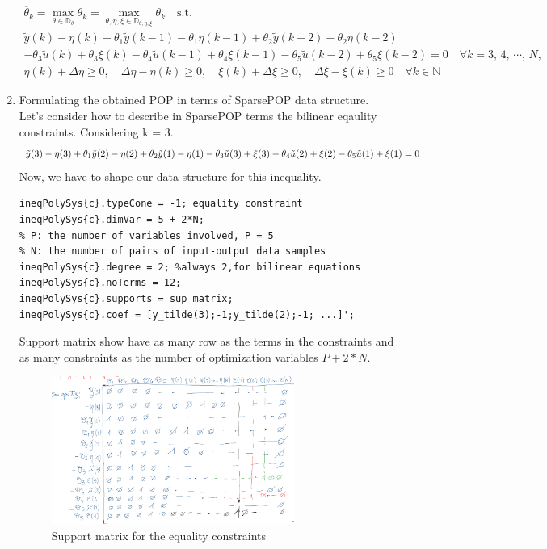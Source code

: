 \begin{enumerate}
\[
\begin{array}{c}
\overline{\theta}_k = \max\limits_{\theta \in \mathbb{D}_\theta} \theta_k = \max\limits_{\theta, \eta, \xi \in \mathbb{D}_{\theta, \eta, \xi}} \theta_k \quad \text{s.t.} \\
\tilde{y}(k) - \eta(k) + \theta_1 \tilde{y}(k-1) - \theta_1\eta(k-1) + \theta_2 \tilde{y}(k-2) - \theta_2\eta(k-2) \\
- \theta_3 \tilde{u}(k) +\theta_3 \xi(k) - \theta_4 \tilde{u}(k-1) + \theta_4\xi(k-1) - \theta_5 \tilde{u}(k-2) + \theta_5 \xi(k-2) = 0 \quad \forall k = 3,\,4,\,\cdots,\,N,\\
\eta(k) + \Delta\eta \geq 0, \quad \Delta\eta - \eta(k) \geq 0, \quad \xi(k) + \Delta\xi \geq 0, \quad \Delta\xi - \xi(k) \geq 0 \quad \forall k \in \mathbb{N} 
\end{array}
\]
\item Formulating the obtained POP in terms of SparsePOP data structure.\\
Let's consider how to describe in SparsePOP terms the bilinear eqaulity constraints. Considering k = 3.
\[
\tilde{y}(3) - \eta(3) + \theta_1 \tilde{y}(2) - \eta(2) + \theta_2 \tilde{y}(1) - \eta(1) \\
- \theta_3 \tilde{u}(3) + \xi(3) - \theta_4 \tilde{u}(2) + \xi(2) - \theta_5 \tilde{u}(1) + \xi(1) = 0
\]
Now, we have to shape our data structure for this inequality.
\begin{example}
\begin{lstlisting}
ineqPolySys{c}.typeCone = -1; equality constraint
ineqPolySys{c}.dimVar = 5 + 2*N; 
% P: the number of variables involved, P = 5
% N: the number of pairs of input-output data samples
ineqPolySys{c}.degree = 2; %always 2,for bilinear equations
ineqPolySys{c}.noTerms = 12;
ineqPolySys{c}.supports = sup_matrix;
ineqPolySys{c}.coef = [y_tilde(3);-1;y_tilde(2);-1; ...]';
\end{lstlisting}
\end{example}
Support matrix show have as many row as the terms in the constraints and as many constraints as the number of optimization variables $P + 2*N$.
\newpage
\begin{figure}[htbp]  %
    \centering
    \includegraphics[width=0.75\textwidth]{images/support-matrix1.png}
    \caption{Support matrix for the equality constraints}
    \label{fig:non-convex-FPS}
\end{figure}
\end{enumerate}

